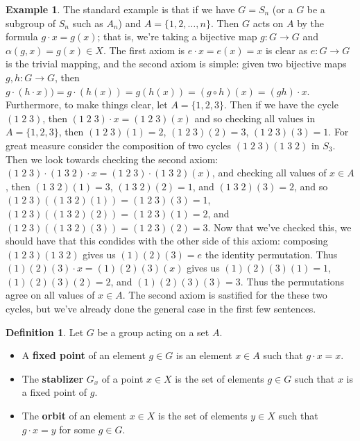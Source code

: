 \documentclass[9pt,reqno]{amsart}
\theoremstyle{definition}
\newtheorem{defi}{Definition}[section]
\newtheorem{ex}{Example}[section]
\begin{document}
\begin{ex}
The standard example is that if we have $G = S_n$ (or a $G$ be a subgroup of $S_n$ such as $A_n$) and $A = \{ 1, 2, \ldots, n \}$. Then $G$ acts on $A$ by the formula $g \cdot x = g(x)$; that is, we're taking a bijective map $g \colon G \to G$ and $\alpha (g, x) = g(x) \in X$. The first axiom is $e \cdot x = e(x) = x$ is clear as $e \colon G \to G$ is the trivial mapping, and the second axiom is simple: given two bijective maps $g, h \colon G \to G$, then $g \cdot (h \cdot x)) = g \cdot (h(x)) = g(h(x)) = (g \circ h)(x) = (gh)\cdot x$. Furthermore, to make things clear, let $A = \{1, 2,3 \}$. Then if we have the cycle $(1 \; 2 \; 3) $, then $(1 \; 2 \; 3)\cdot x = (1 \; 2 \; 3)(x)$ and so checking all values in $A = \{1, 2, 3 \}$, then $(1 \; 2 \; 3) (1) = 2$, $(1 \; 2 \; 3) (2) = 3$, $(1 \; 2 \; 3) (3) = 1$. For great measure consider the composition of two cycles $( 1 \; 2 \; 3) ( 1 \; 3 \; 2)$ in $S_3$. Then we look towards checking the second axiom: $(1 \; 2 \; 3) \cdot  (1 \; 3 \; 2) \cdot x  = (1 \; 2 \; 3) \cdot (1 \; 3 \; 2) (x)$, and checking all values of $x \in A$, then $(1 \; 3 \; 2) (1) = 3$, $(1 \; 3 \; 2) (2) = 1$, and $(1 \; 3 \; 2) (3) = 2$, and so $ (1 \; 2 \; 3) ((1 \; 3 \; 2) (1)) = (1 \; 2 \; 3) (3) = 1$, $ (1 \; 2 \; 3) ((1 \; 3 \; 2) (2)) = (1 \; 2 \; 3) (1) = 2$, and $ (1 \; 2 \; 3) ((1 \; 3 \; 2) (3)) = (1 \; 2 \; 3) (2) = 3$. Now that we've checked this, we should have that this condides with the other side of this axiom: composing $( 1 \; 2 \; 3) ( 1 \; 3 \; 2)$ gives us $(1) (2) (3) = e$ the identity permutation. Thus $(1) (2) (3) \cdot x = (1) (2) (3)(x)$ gives us $(1) (2) (3) (1) = 1$, $(1) (2) (3) (2) = 2$, and $(1) (2) (3) (3) = 3$. Thus the permutations agree on all values of $x \in A$. The second axiom is sastified for the these two cycles, but we've already done the general case in the first few sentences. 
\end{ex}
\begin{defi}Let $G$ be a group acting on a set $A$. 
\begin{itemize}
	\item A \textbf{fixed point} of an element $g \in G$ is an element $x \in A$ such that $g \cdot x = x$.
	\item The \textbf{stablizer} $G_x$ of a point $x \in X$ is the set of elements $g \in G$ such that $x$ is a fixed point of $g$. 
	\item The \textbf{orbit} of an element $x \in X$ is the set of elements $y \in X$ such that $g \cdot x = y$ for some $g \in G$. 
\end{itemize}
\end{defi}
\end{document}
